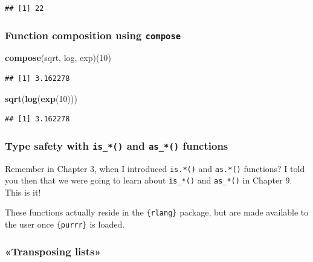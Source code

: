 \documentclass[]{gitbook}
\newenvironment{Shaded}{\begin{snugshade}}{\end{snugshade}}
\newcommand{\DecValTok}[1]{\textcolor[rgb]{0.00,0.00,0.81}{#1}}
\newcommand{\KeywordTok}[1]{\textcolor[rgb]{0.13,0.29,0.53}{\textbf{#1}}}
\newcommand{\NormalTok}[1]{#1}
\begin{document}
\begin{verbatim}
## [1] 22
\end{verbatim}

\hypertarget{function-composition-using-compose}{%
\subsubsection{\texorpdfstring{Function composition using \texttt{compose}}{Function composition using compose}}\label{function-composition-using-compose}}

\begin{Shaded}
\begin{Highlighting}[]
\KeywordTok{compose}\NormalTok{(sqrt, log, exp)(}\DecValTok{10}\NormalTok{)}
\end{Highlighting}
\end{Shaded}

\begin{verbatim}
## [1] 3.162278
\end{verbatim}

\begin{Shaded}
\begin{Highlighting}[]
\KeywordTok{sqrt}\NormalTok{(}\KeywordTok{log}\NormalTok{(}\KeywordTok{exp}\NormalTok{(}\DecValTok{10}\NormalTok{)))}
\end{Highlighting}
\end{Shaded}

\begin{verbatim}
## [1] 3.162278
\end{verbatim}

\hypertarget{type-safety-with-is_-and-as_-functions}{%
\subsubsection{\texorpdfstring{Type safety with \texttt{is\_*()} and \texttt{as\_*()} functions}{Type safety with is\_*() and as\_*() functions}}\label{type-safety-with-is_-and-as_-functions}}

Remember in Chapter 3, when I introduced \texttt{is.*()} and \texttt{as.*()} functions? I told you then that we
were going to learn about \texttt{is\_*()} and \texttt{as\_*()} in Chapter 9. This is it!

These functions actually reside in the \texttt{\{rlang\}} package, but are made available to the user once
\texttt{\{purrr\}} is loaded.

\hypertarget{transposing-lists}{%
\subsubsection{«Transposing lists»}\label{transposing-lists}}
\end{document}
